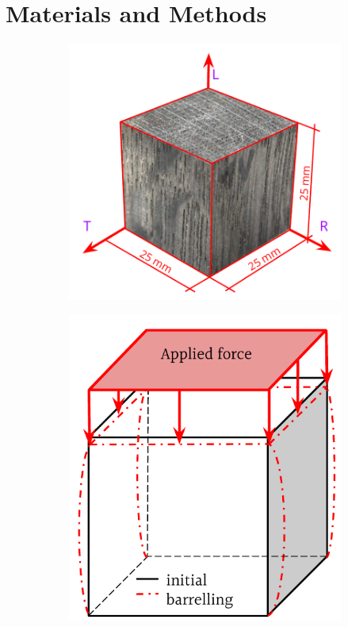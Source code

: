 \documentclass[3p]{elsarticle}
\begin{document}
\section{Materials and Methods}

\begin{figure}
    \centering
    \begin{subfigure}[b]{0.4\textwidth}
        \centering
        \includegraphics[width=\textwidth]{VasaCube.pdf}
        \caption{}
        \label{fig:vasacube}
         \vspace*{1cm}
    \end{subfigure}
    \hfill
    \begin{subfigure}[b]{0.4\textwidth}
        \centering
        \includegraphics[width=\textwidth]{BarellingEffectZoomed.pdf}

\end{subfigure}
\end{figure}
\end{document}

